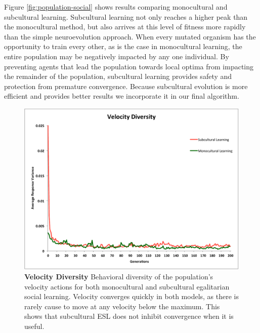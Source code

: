 \documentclass{sig-alternate}
\begin{document}
Figure \ref{fig:population-social} shows results comparing monocultural and subcultural learning. Subcultural learning not only reaches a higher peak than the monocultural method, but also arrives at this level of fitness more rapidly than the simple neuroevolution approach. When every mutated organism has the opportunity to train every other, as is the case in monocultural learning, the entire population may be negatively impacted by any one individual. By preventing agents that lead the population towards local optima from impacting the remainder of the population, subcultural learning provides safety and protection from premature convergence.  Because subcultural evolution is more efficient and provides better results we incorporate it in our final algorithm.

\begin{figure}
  \centering
    \includegraphics[scale=.41]{velocity_diversity.pdf}
  \caption{\textbf{Velocity Diversity} Behavioral diversity of the population's velocity actions for both monocultural and subcultural egalitarian social learning.   Velocity converges quickly in both models, as there is rarely cause to move at any velocity below the maximum.  This shows that subcultural ESL does not inhibit convergence when it is useful.}
  \label{fig:velocity}
\end{figure}
\end{document}
